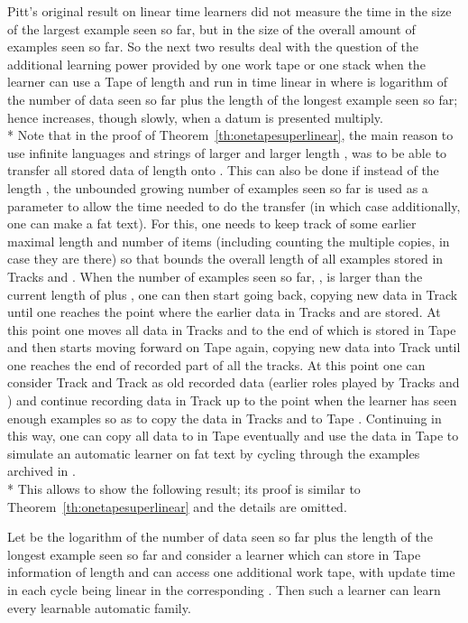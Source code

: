 \documentclass{LMCS}
\theoremstyle{plain}\newtheorem{athm}[thm]{Theorem}
\theoremstyle{plain}\newtheorem{aprop}[thm]{Proposition}
\theoremstyle{plain}\newtheorem{aprob}[thm]{Open Problem}
\theoremstyle{plain}\newtheorem{acor}[thm]{Corollary}
\theoremstyle{plain}\newtheorem{alem}[thm]{Lemma}
\theoremstyle{definition}\newtheorem{adefn}[thm]{Definition}
\theoremstyle{definition}\newtheorem{arem}[thm]{Remark}
\theoremstyle{plain}\newtheorem{aexmp}[thm]{Example}
\theoremstyle{plain}\newtheorem{aclm}[thm]{Claim}
\def\sp{\\*\indent}
\begin{document}
\medskip
\noindent
Pitt's original result \cite{Pi89} on linear time learners did not measure the
time in the size of the largest example seen so far, but in the size
of the overall amount of examples seen so far. So the next two results
deal with the question of the additional learning power provided by
one work tape or one stack when the learner can use a Tape  of
length  and run in time linear in  where  is logarithm of the number
of data seen so far plus the length of the longest example seen so far;
hence  increases, though slowly, when a datum is presented multiply.
\sp
Note that in the proof of Theorem~\ref{th:onetapesuperlinear}, the main reason
to use infinite languages and strings of larger and larger length , was to be
able to transfer all stored data of length  onto .
This can also be done if instead of the length , the unbounded growing number
of examples seen so far is used as a parameter to allow the time needed to
do the transfer (in which case additionally, one can make  a fat text). 
For this, one needs to keep track of some earlier maximal length  and 
number of items  (including counting the multiple copies, in case they 
are there) so that  bounds the overall length of all
examples stored in Tracks  and .
When the number of examples seen so far, , is larger than the current
length of  plus , one
can then start going back, copying new data in Track  until one reaches
the point where the earlier data in Tracks  and  are stored.
At this point one moves all data in Tracks  and  to the end of 
which is stored in Tape  and then
starts moving forward on Tape  again,
copying new data into Track  until one reaches
the end of recorded part of all the tracks. At this point one can consider
Track  and Track  as old recorded data (earlier roles played by Tracks 
and ) and continue recording data in Track  up to the point when
the learner has seen enough examples so as to copy the data in Tracks 
and  to Tape . Continuing in this way, one can copy all data to 
in Tape  eventually and use the data in Tape  to simulate an automatic
learner on fat text by cycling through the examples archived in .
\sp
This allows to show the following result; its
proof is similar to Theorem~\ref{th:onetapesuperlinear} and
the details are omitted.

\begin{thm}
Let  be the logarithm of the number
of data seen so far plus the length of the longest example seen so far
and consider a learner which can store in Tape  information of length 
and can access one additional work tape, with 
update time in each cycle being linear in the corresponding .
Then such a learner can learn every 
learnable automatic family.
\end{thm}
\end{document}
